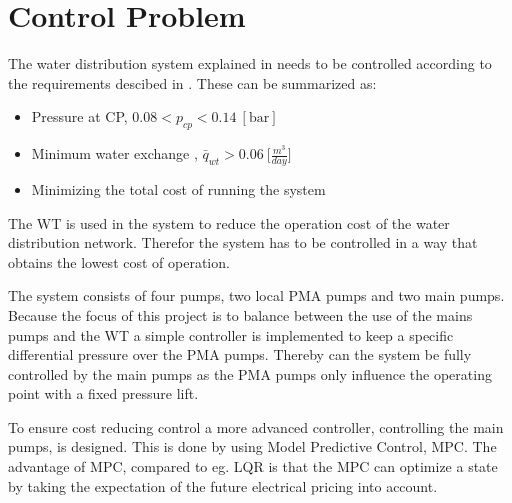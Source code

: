\section{Control Problem}
\label{control_problem}
\vspace{-1mm}
The water distribution system explained in  needs to be controlled according to the requirements descibed in . These can be summarized as: 
\vspace{-1mm}
\begin{itemize}
	\item Pressure at CP, $0.08 < p_{cp} < 0.14 \:[\text{bar}]$
%
	\item Minimum water exchange , $\bar{q}_{wt} > 0.06 \: \big[\frac{m^3}{day}\big]$
%
	\item Minimizing the total cost of running the system
\end{itemize}
\vspace{-1mm}
The WT is used in the system to reduce the operation cost of the water distribution network. Therefor the system has to be controlled in a way that obtains the lowest cost of operation. 

The system consists of four pumps, two local PMA pumps and two main pumps. Because the focus of this project is to balance between the use of the mains pumps and the WT a simple controller is implemented to keep a specific differential pressure over the PMA pumps. Thereby can the system be fully controlled by the main pumps as the PMA pumps only influence the operating point with a fixed pressure lift.

To ensure cost reducing control a more advanced controller, controlling the main pumps, is designed. This is done by using Model Predictive Control, MPC. The advantage of MPC, compared to eg. LQR is that the MPC can optimize a state by taking the expectation of the future electrical pricing into account. 


